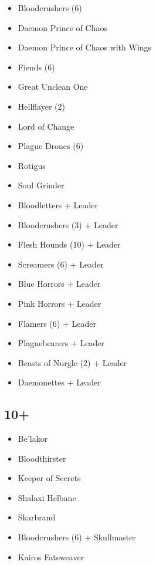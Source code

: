 \documentclass{HordeModeTarot}
\begin{document}
\begin{multicols}{2}
\begin{itemize}[leftmargin=*]
\item[] Bloodcrushers (6)
\item[] Daemon Prince of Chaos
\item[] Daemon Prince of Chaos with Wings
\item[] Fiends (6)
\item[] Great Unclean One
\item[] Hellflayer (2)
\item[] Lord of Change
\item[] Plague Drones (6)
\item[] Rotigus
\item[] Soul Grinder
\item[] Bloodletters + Leader
\item[] Bloodcrushers (3) + Leader
\item[] Flesh Hounds (10) + Leader
\item[] Screamers (6) + Leader
\item[] Blue Horrors + Leader
\item[] Pink Horrors + Leader
\item[] Flamers (6) + Leader
\item[] Plaguebearers + Leader
\item[] Beasts of Nurgle (2) + Leader
\item[] Daemonettes + Leader
\end{itemize}

\subsection*{10+}

\begin{itemize}[leftmargin=*]
\item[] Be'lakor
\item[] Bloodthirster
\item[] Keeper of Secrets
\item[] Shalaxi Helbane
\item[] Skarbrand
\item[] Bloodcrushers (6) + Skullmaster
\item[] Kairos Fateweaver
\end{itemize}


\end{multicols}
\end{document}
